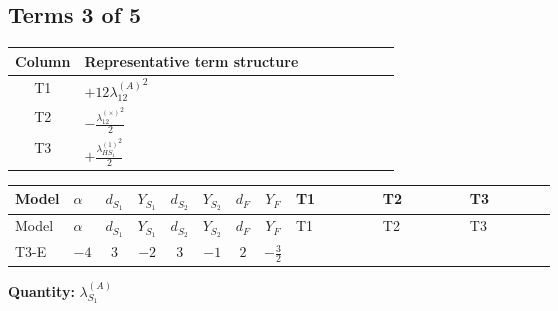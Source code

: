 \documentclass[8pt]{article}
\begin{document}
\begin{landscape}
\subsection*{Terms 3 of 5}
\begin{center}
\begin{tabular}{@{}c >{\raggedright\arraybackslash}p{0.82\linewidth}@{}}
\toprule
Column & Representative term structure \\
\midrule
T1 & \(\displaystyle +12 {\lambda_{12}^{(A)}}^2\) \\
\midrule
T2 & \(\displaystyle -\frac{{\lambda_{12}^{(\times)}}^2}{2}\) \\
\midrule
T3 & \(\displaystyle +\frac{{\lambda_{HS_1}^{(1)}}^2}{2}\) \\
\midrule
\bottomrule
\end{tabular}
\end{center}
\smallskip
\tiny
\begin{longtable}{@{}llcccccc >{\raggedright\arraybackslash}p{0.21\linewidth} >{\raggedright\arraybackslash}p{0.21\linewidth} >{\raggedright\arraybackslash}p{0.21\linewidth}@{}}
\toprule
Model & $\alpha$ & $d_{S_1}$ & $Y_{S_1}$ & $d_{S_2}$ & $Y_{S_2}$ & $d_F$ & $Y_F$ & T1 & T2 & T3 \\
\midrule
\endfirsthead
\toprule
Model & $\alpha$ & $d_{S_1}$ & $Y_{S_1}$ & $d_{S_2}$ & $Y_{S_2}$ & $d_F$ & $Y_F$ & T1 & T2 & T3 \\
\midrule
\endhead
T3-E & $-4$ & $3$ & $-2$ & $3$ & $-1$ & $2$ & $-\frac{3}{2}$ & \scriptsize\adjustbox{max width=\linewidth}{$\begin{gathered} +12 {\lambda_{12}^{(A)}}^2\end{gathered}$} & \scriptsize\adjustbox{max width=\linewidth}{$\begin{gathered} -\frac{{\lambda_{12}^{(\times)}}^2}{2}\end{gathered}$} & \scriptsize\adjustbox{max width=\linewidth}{$\begin{gathered} +\frac{{\lambda_{HS_1}^{(1)}}^2}{2}\end{gathered}$} \\
\midrule
\bottomrule
\end{longtable}
\clearpage
\noindent\textbf{Quantity: }$\lambda_{S_1}^{(A)}$\par\smallskip

\end{landscape}
\end{document}
